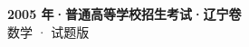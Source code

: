 \documentclass[zihao=-4, a4paper]{ctexart}
\begin{document}
\begin{center}
  {\Large\bfseries 2005 年·普通高等学校招生考试·辽宁卷}\\[4pt]
  {\large 数学 · 试题版}
\end{center}
\medskip
{}

\end{document}
